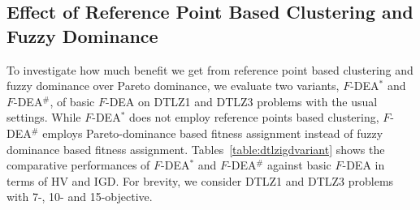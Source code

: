 \documentclass[review]{elsarticle}
\begin{document}


\subsection{Effect of Reference Point Based Clustering and Fuzzy Dominance}
\label{subsec:impactofrefdominance}
To investigate how much benefit we get from reference point based clustering and 
fuzzy dominance over Pareto dominance, we evaluate two variants, $F$-DEA$^{*}$ and $F$-DEA$^{\#}$, of basic $F$-DEA on DTLZ1 and DTLZ3 problems with the usual settings. While $F$-DEA$^{*}$ does not employ  reference points based clustering,  $F$-DEA$^{\#}$ employs Pareto-dominance based fitness assignment instead of fuzzy dominance based fitness assignment. Tables~\ref{table:dtlzigdvariant} shows the comparative performances of $F$-DEA$^{*}$ and $F$-DEA$^{\#}$ against basic $F$-DEA in terms of HV and IGD. For brevity, we consider  DTLZ1 and DTLZ3 problems with 7-, 10- and 15-objective.
\end{document}
